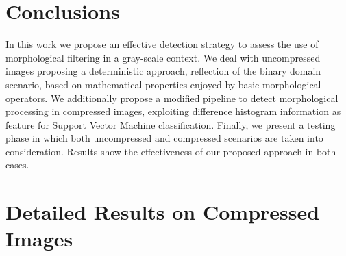 \documentclass[review]{elsarticle}
\begin{document}
\section{Conclusions}
In this work we propose an effective detection strategy to assess the use of morphological filtering in a gray-scale context. We deal with uncompressed images proposing a deterministic approach, reflection of the binary domain scenario, based on mathematical properties enjoyed by basic morphological operators. We additionally propose a modified pipeline to detect morphological processing in compressed images, exploiting difference histogram information as feature for Support Vector Machine classification. Finally, we present a testing phase in which both uncompressed and compressed scenarios are taken into consideration. Results show the effectiveness of our proposed approach in both cases.  
 


\appendix
\section{Detailed Results on Compressed Images}
\label{app:detailed_compress}
\end{document}
